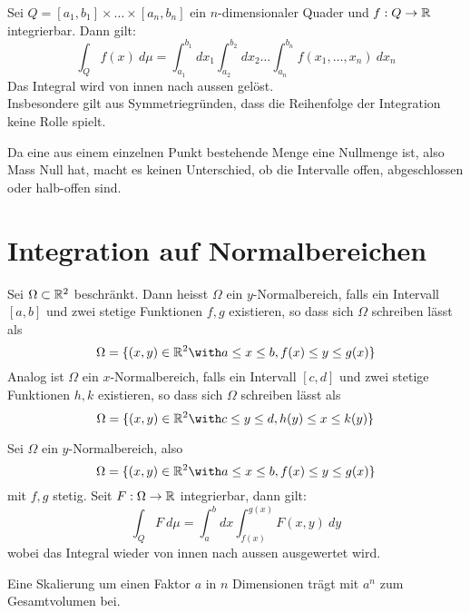 \begin{theorem}
    Sei $Q = [a_1, b_1] \times \dots \times [a_n, b_n]$ ein $n$-dimensionaler Quader und $f: Q \to \mathbb{R}$ integrierbar. Dann gilt:
$$ \int_Q f(x) \: d\mu = \int_{a_1}^{b_1} dx_1 \int_{a_2}^{b_2} dx_2 \dots \int_{a_n}^{b_n} f(x_1, \dots, x_n) \: dx_n$$
Das Integral wird von innen nach aussen gelöst.\\Insbesondere gilt aus Symmetriegründen, dass die Reihenfolge der Integration keine Rolle spielt.
\end{theorem}

\begin{remark}
    Da eine aus einem einzelnen Punkt bestehende Menge eine Nullmenge ist, also Mass Null hat, macht es keinen Unterschied, ob die Intervalle offen, abgeschlossen oder halb-offen sind.
\end{remark}

\section{Integration auf Normalbereichen}

\begin{definition}
    Sei $\Omega \subset \mathbb{R}^2$ beschränkt. Dann heisst $\Omega$ ein $y$-Normalbereich, falls ein Intervall $[a,b]$ und zwei stetige Funktionen $f,g$ existieren, so dass sich $\Omega$ schreiben lässt als
    $$ \Omega = \{(x,y) \in \R^2 \with a \leq x \leq b, f(x) \leq y \leq g(x)\}$$Analog ist $\Omega$ ein $x$-Normalbereich, falls ein Intervall $[c,d]$ und zwei stetige Funktionen $h,k$ existieren, so dass sich $\Omega$ schreiben lässt als
    $$ \Omega = \{(x,y) \in \R^2 \with c \leq y \leq d, h(y) \leq x \leq k(y)\}$$
\end{definition}

\begin{theorem}
    Sei $\Omega$ ein $y$-Normalbereich, also 
    $$ \Omega = \{(x,y) \in \R^2 \with a \leq x \leq b, f(x) \leq y \leq g(x)\}$$ mit $f,g$ stetig. Seit $F : \Omega \to \mathbb{R}$ integrierbar, dann gilt:
    $$ \int_Q F \: d \mu = \int_a^b dx \int_{f(x)}^{g(x)} F(x,y) \: dy$$
    wobei das Integral wieder von innen nach aussen ausgewertet wird.
\end{theorem}

\begin{remark}[Skalierungstrick]
    Eine Skalierung um einen Faktor $a$ in $n$ Dimensionen trägt mit $a^n$ zum Gesamtvolumen bei.
\end{remark}

